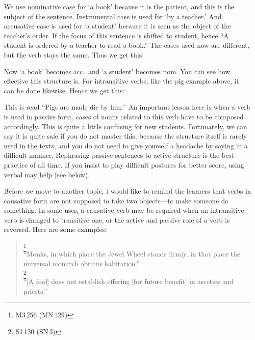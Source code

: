 
We use nominative case for `a book' because it is the patient, and this is the subject of the sentence. Instrumental case is used for `by a teacher.' And accusative case is used for `a student' because it is seen as the object of the teacher's order. If the focus of this sentence is shifted to student, hence ``A student is ordered by a teacher to read a book.'' The cases used now are different, but the verb stays the same. Thus we get this:


Now `a book' becomes acc.\ and `a student' becomes nom. You can see how effective this structure is. For intransitive verbs, like the pig example above, it can be done likewise. Hence we get this:


This is read ``Pigs are made die by him.'' An important lesson here is when a verb is used in passive form, cases of nouns related to this verb have to be composed accordingly. This is quite a little confusing for new students. Fortunately, we can say it is quite safe if you do not master this, because the structure itself is rarely used in the texts, and you do not need to give yourself a headache by saying in a difficult manner. Rephrasing passive sentences to active structure is the best practice of all time. If you insist to play difficult postures for better score, using verbal  may help (see below).

Before we move to another topic, I would like to remind the learners that verbs in causative form are not supposed to take two objects---to make someone do something. In some uses, a causative verb may be required when an intransitive verb is changed to transitive one, or the active and passive role of a verb is reversed. Here are some examples:

\begin{quote}
\footnote{M3\,256 (MN\,129)}\\
``Monks, in which place the Jewel Wheel stands firmly, in that place the universal monarch obtains habitation.''\\[1.5mm]
\footnote{S1\,130 (SN\,3)}\\
``[A fool] does not establish offering [for future benefit] in ascetics and priests.''\\[1.5mm]
\end{quote}

